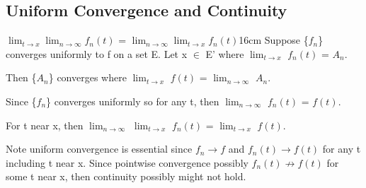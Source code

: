     \newpage





\subsection[ Continuity ]{ Uniform Convergence and Continuity }

    \begin{wtheorem}{$\lim_{t \rightarrow x} \lim_{n \rightarrow \infty} f_n(t)$
    = $\lim_{n \rightarrow \infty} \lim_{t \rightarrow x} f_n(t)$}{16cm}
        Suppose \{$f_n$\} converges uniformly to f on a set E.
        Let x $\in$ E' where $\lim_{t \rightarrow x}$ $f_n(t)$ = $A_n$.

        Then \{$A_n$\} converges where
        $\lim_{t \rightarrow x}$ $f(t)$ = $\lim_{n \rightarrow \infty}$ $A_n$.
    \end{wtheorem}

    \begin{intuition}
        Since \{$f_n$\} converges uniformly so for any t, then
        $\lim_{n \rightarrow \infty}$ $f_n(t)$ = $f(t)$.

        For t near x, then
        $\lim_{n \rightarrow \infty}$ $\lim_{t \rightarrow x}$ $f_n(t)$
        = $\lim_{t \rightarrow x}$ $f(t)$.

        \vspace{0.2cm}

        Note uniform convergence is essential since $f_n \rightarrow f$
        and $f_n(t) \rightarrow f(t)$ for any t including t near x.
        Since pointwise convergence possibly $f_n(t) \not \rightarrow f(t)$
        for some t near x,
        then continuity possibly might not hold.
    \end{intuition}

    \vspace{0.1cm}

